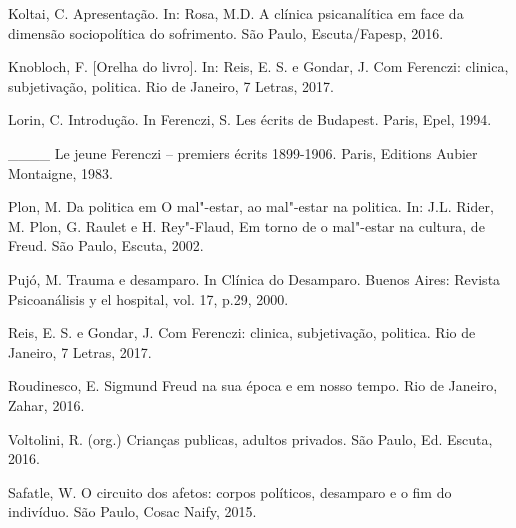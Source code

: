 Koltai, C. Apresentação. In: Rosa, M.D. A clínica psicanalítica em face
da dimensão sociopolítica do sofrimento. São Paulo, Escuta/Fapesp, 2016.

Knobloch, F. {[}Orelha do livro{]}. In: Reis, E. S. e Gondar, J. Com
Ferenczi: clinica, subjetivação, politica. Rio de Janeiro, 7 Letras,
2017.

Lorin, C. Introdução. In Ferenczi, S. Les écrits de Budapest. Paris,
Epel, 1994.

\_\_\_\_ Le jeune Ferenczi -- premiers écrits 1899-1906. Paris, Editions
Aubier Montaigne, 1983.

Plon, M. Da politica em O mal"-estar, ao mal"-estar na politica. In: J.L.
Rider, M. Plon, G. Raulet e H. Rey"-Flaud, Em torno de o mal"-estar na
cultura, de Freud. São Paulo, Escuta, 2002.

Pujó, M. Trauma e desamparo. In Clínica do Desamparo. Buenos Aires:
Revista Psicoanálisis y el hospital, vol. 17, p.29, 2000.

Reis, E. S. e Gondar, J. Com Ferenczi: clinica, subjetivação, politica.
Rio de Janeiro, 7 Letras, 2017.

Roudinesco, E. Sigmund Freud na sua época e em nosso tempo. Rio de
Janeiro, Zahar, 2016.

Voltolini, R. (org.) Crianças publicas, adultos privados. São Paulo, Ed.
Escuta, 2016.

Safatle, W. O circuito dos afetos: corpos políticos, desamparo e o fim
do indivíduo. São Paulo, Cosac Naify, 2015.
